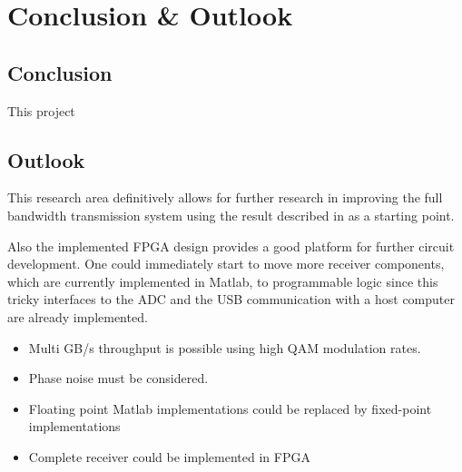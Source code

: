 \chapter{Conclusion \& Outlook}
\section{Conclusion}
This project 


\section{Outlook}
This research area definitively allows for further research in improving
the full bandwidth transmission system using the result described in 
 as a starting point.

Also the implemented \gls{FPGA} design provides a good platform
for further circuit development. One could immediately start to
move more receiver components, which are currently implemented in Matlab,
to programmable logic since this tricky interfaces to the \gls{ADC}
and the \gls{USB} communication with a host computer are already implemented.





\begin{itemize}
\item Multi GB/s throughput is possible using high \gls{QAM} modulation rates.
\item Phase noise must be considered.
\item Floating point Matlab implementations could be replaced by fixed-point implementations
\item Complete receiver could be implemented in \gls{FPGA}
\end{itemize}

